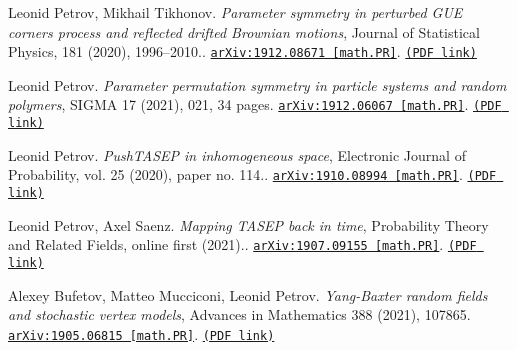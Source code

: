\begin{etaremune}
\item 
Leonid Petrov, Mikhail Tikhonov.
\emph{Parameter symmetry in perturbed GUE corners process and reflected drifted Brownian motions}, Journal of Statistical Physics, 181 (2020), 1996–2010.. 
\href{https://arxiv.org/abs/1912.08671}{\texttt{arXiv:1912.08671 [math.PR]}}. \href{https://storage.lpetrov.cc/research_files/Petrov-publ/pert_GUE_symm.pdf}{\texttt{(PDF link)}}



\item 
Leonid Petrov.
\emph{Parameter permutation symmetry in particle systems and random polymers}, SIGMA 17 (2021), 021, 34 pages. 
\href{https://arxiv.org/abs/1912.06067}{\texttt{arXiv:1912.06067 [math.PR]}}. \href{https://storage.lpetrov.cc/research_files/Petrov-publ/symm_IPS.pdf}{\texttt{(PDF link)}}



\item 
Leonid Petrov.
\emph{PushTASEP in inhomogeneous space}, Electronic Journal of Probability, vol. 25 (2020), paper no. 114.. 
\href{https://arxiv.org/abs/1910.08994}{\texttt{arXiv:1910.08994 [math.PR]}}. \href{https://storage.lpetrov.cc/research_files/Petrov-publ/33-publ-petrov-uva.pdf}{\texttt{(PDF link)}}









\item 
Leonid Petrov, Axel Saenz.
\emph{Mapping TASEP back in time}, Probability Theory and Related Fields, online first (2021).. 
\href{https://arxiv.org/abs/1907.09155}{\texttt{arXiv:1907.09155 [math.PR]}}. \href{https://storage.lpetrov.cc/research_files/Petrov-publ/backwards_TASEP_preprint.pdf}{\texttt{(PDF link)}}







\item 
Alexey Bufetov, Matteo Mucciconi, Leonid Petrov.
\emph{Yang-Baxter random fields and stochastic vertex models}, Advances in Mathematics 388 (2021), 107865. 
\href{https://arxiv.org/abs/1905.06815}{\texttt{arXiv:1905.06815 [math.PR]}}. \href{https://storage.lpetrov.cc/research_files/Petrov-publ/31-publ-petrov-uva.pdf}{\texttt{(PDF link)}}
















\end{etaremune}
